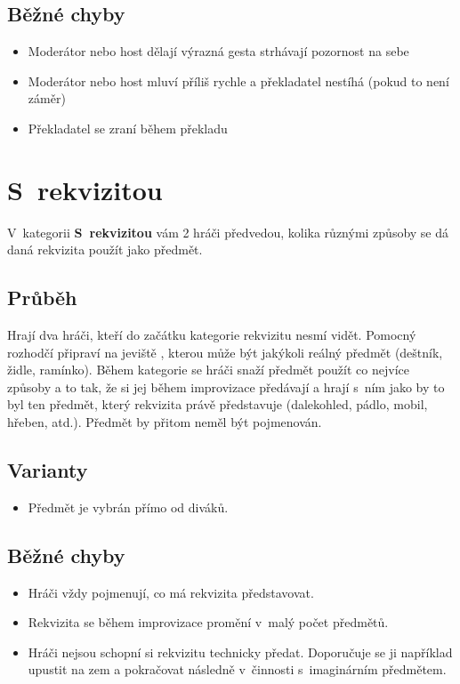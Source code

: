 \subsection{ Běžné chyby } \begin{itemize}
\item  Moderátor nebo host dělají výrazná gesta strhávají pozornost na sebe
\item  Moderátor nebo host mluví příliš rychle a překladatel nestíhá (pokud to není záměr)
\item  Překladatel se zraní během překladu
\end{itemize}
 
 
 
 
 
 
\needspace{5cm} \section{S~rekvizitou} \label{s~rekvizitou}  
 
V~kategorii \textbf{S~rekvizitou} vám 2 hráči předvedou, kolika různými způsoby se dá daná rekvizita použít jako předmět. 
 
\subsection{Průběh} Hrají dva hráči, kteří do začátku kategorie rekvizitu nesmí vidět. Pomocný rozhodčí připraví na jeviště , kterou může být jakýkoli reálný předmět (deštník, židle, ramínko). Během kategorie se hráči snaží předmět použít co nejvíce způsoby a to tak, že si jej během improvizace předávají a hrají s~ním jako by to byl ten předmět, který rekvizita právě představuje (dalekohled, pádlo, mobil, hřeben, atd.).  Předmět by přitom neměl být pojmenován. 
 
\subsection{ Varianty } \begin{itemize}
\item Předmět je vybrán přímo od diváků.
\end{itemize}
 
\subsection{ Běžné chyby } \begin{itemize}
\item Hráči vždy pojmenují, co má rekvizita představovat.
\item Rekvizita se během improvizace promění v~malý počet předmětů.
\item Hráči nejsou schopní si rekvizitu technicky předat. Doporučuje se ji například upustit na zem a pokračovat následně v~činnosti s~imaginárním předmětem.
\end{itemize}
 
